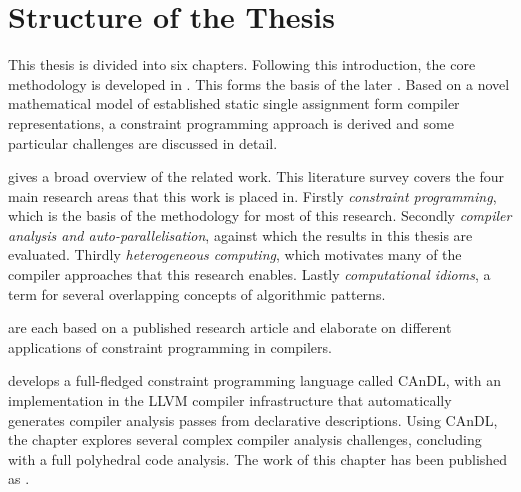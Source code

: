 

\newpage
\section{Structure of the Thesis}

    This thesis is divided into six chapters.
    Following this introduction, the core methodology is developed in
    {\bf{}}.
    This forms the basis of the later
    {\bf{}}.
    Based on a novel mathematical model of established static single assignment
    form compiler representations, a constraint programming approach is derived
    and some particular challenges are discussed in detail.

    {\bf{}} gives a broad overview of the related work.
    This literature survey covers the four main research areas that this work
    is placed in.
    Firstly {\em constraint programming}, which is the basis of the methodology
    for most of this research.
    Secondly {\em compiler analysis and auto-parallelisation}, against which the
    results in this thesis are evaluated.
    Thirdly {\em heterogeneous computing}, which motivates many of the compiler
    approaches that this research enables.
    Lastly {\em computational idioms}, a term for several overlapping concepts
    of algorithmic patterns.

    {\bf{}}
    are each based on a published research article and elaborate on different
    applications of constraint programming in compilers.

    {\bf{}} develops a full-fledged constraint programming
    language called CAnDL, with an implementation in the LLVM compiler
    infrastructure that automatically generates compiler analysis passes from
    declarative descriptions.
    Using CAnDL, the chapter explores several complex compiler analysis
    challenges, concluding with a full polyhedral code analysis.
    The work of this chapter has been published as
    {\bf\citet{Ginsbach:2018:CDS:3178372.3179515}}.


